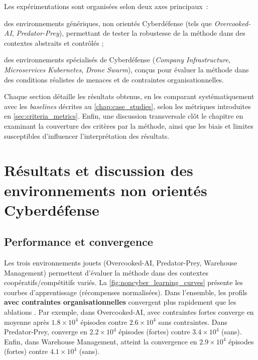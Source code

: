 Les expérimentations sont organisées selon deux axes principaux~:
\begin{enumerate*}[label={\roman*)}, itemjoin={; \quad}]
  \item des environnements génériques, non orientés Cyberdéfense (tels que \textit{Overcooked-AI}, \textit{Predator-Prey}), permettant de tester la robustesse de la méthode dans des contextes abstraits et contrôlés ;
  \item des environnements spécialisés de Cyberdéfense (\textit{Company Infrastructure}, \textit{Microservices Kubernetes}, \textit{Drone Swarm}), conçus pour évaluer la méthode dans des conditions réalistes de menaces et de contraintes organisationnelles.
\end{enumerate*}

Chaque section détaille les résultats obtenus, en les comparant systématiquement avec les \textit{baselines} décrites au \autoref{chap:case_studies}, selon les métriques introduites en \autoref{sec:criteria_metrics}.
Enfin, une discussion transversale clôt le chapitre en examinant la couverture des critères par la méthode, ainsi que les biais et limites susceptibles d'influencer l'interprétation des résultats.

\section{Résultats et discussion des environnements non orientés Cyberdéfense}\label{sec:results_and_discussion_cyberdefense}

\subsection*{Performance et convergence}

Les trois environnements jouets (Overcooked-AI, Predator-Prey, Warehouse Management) permettent d'évaluer la méthode  dans des contextes coopératifs/compétitifs variés.
La \autoref{fig:noncyber_learning_curves} présente les courbes d'apprentissage (récompenses normalisées).
Dans l'ensemble, les profils \textbf{avec contraintes organisationnelles} convergent plus rapidement que les ablations \texttt{}.
Par exemple, dans Overcooked-AI,  avec contraintes fortes converge en moyenne après $1.8\times 10^4$ épisodes contre $2.6\times 10^4$ sans contraintes.
Dans Predator-Prey,  converge en $2.2\times 10^4$ épisodes (fortes) contre $3.4\times 10^4$ (sans).
Enfin, dans Warehouse Management,  atteint la convergence en $2.9\times 10^4$ épisodes (fortes) contre $4.1\times 10^4$ (sans).

